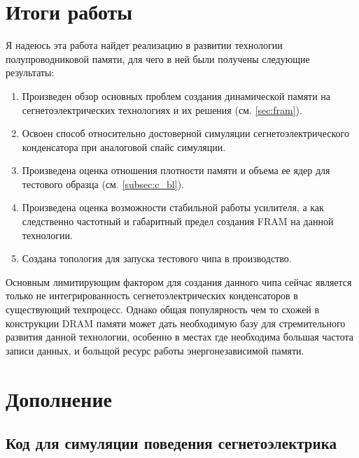 \documentclass[a4paper,12pt]{article} %
\begin{document}
\section{Итоги работы}

Я надеюсь эта работа найдет реализацию в развитии технологии полупроводниковой памяти, для чего в ней были получены следующие результаты:

\begin{enumerate}


	\item Произведен обзор основных проблем  создания динамической памяти на сегнетоэлектрических технологиях и их решения (см. \ref{sec:fram}).
	\item Освоен способ относительно достоверной симуляции сегнетоэлектрического конденсатора при аналоговой спайс симуляции.
	\item Произведена оценка отношения плотности памяти и объема ее ядер для тестового образца (см. \ref{subsec:c_bl}).
	\item Произведена оценка возможности стабильной работы усилителя, а как следственно частотный и габаритный предел создания FRAM на данной технологии.
	\item Создана топология для запуска тестового чипа в производство.
\end{enumerate}

Основным лимитирующим фактором для создания данного чипа сейчас является только не интегрированность сегнетоэлектрических конденсаторов в существующий техпроцесс. Однако общая популярность чем то схожей в конструкции DRAM памяти может дать необходимую базу для стремительного развития данной технологии, особенно в местах где необходима большая частота записи данных, и больщой ресурс работы энергонезависимой памяти.








\newpage
\appendix
\section{Дополнение}
\subsection{Код для симуляции поведения сегнетоэлектрика}
\end{document}
